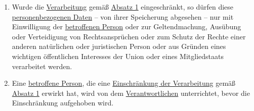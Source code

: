 \begin{enumerate}
  \item Wurde die \hyperref[itm:04-2]{Verarbeitung} gemäß \hyperref[itm:18-1]{Absatz 1} eingeschränkt, so dürfen diese \hyperref[itm:04-1]{personenbezogenen Daten}
   -- von ihrer Speicherung abgesehen -- nur mit Einwilligung der \hyperref[itm:04-1]{betroffenen Person} oder zur Geltendmachung, Ausübung
   oder Verteidigung von Rechtsansprüchen oder zum Schutz der Rechte einer anderen natürlichen oder juristischen
   Person oder aus Gründen eines wichtigen öffentlichen Interesses der Union oder eines Mitgliedstaats verarbeitet
   werden.
  \label{itm:18-2}

  \item Eine \hyperref[itm:04-1]{betroffene Person}, die eine \hyperref[itm:04-3]{Einschränkung der Verarbeitung} gemäß \hyperref[itm:18-1]{Absatz 1} erwirkt hat,
   wird von dem \hyperref[itm:04-7]{Verantwortlichen} unterrichtet, bevor die Einschränkung aufgehoben wird.
  \label{itm:18-3}

\end{enumerate}


